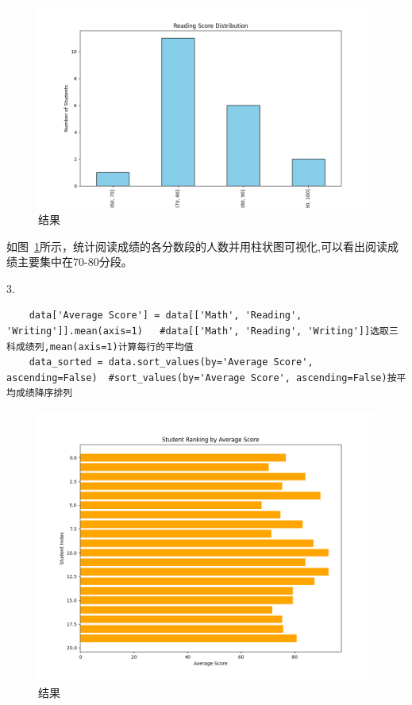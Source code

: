 \documentclass[12pt,a4paper,oneside]{article}
\begin{document}
\begin{figure}[H]
    \centering
    \begin{minipage}{0.4\textwidth}
        \centering
        \includegraphics[width=\textwidth]{image/Figure_1.png} %
        \caption{结果}
        \label{fig:image3}
    \end{minipage}
\end{figure}

如图~\ref{fig:image3}所示，统计阅读成绩的各分数段的人数并用柱状图可视化,可以看出阅读成绩主要集中在70-80分段。


3.\begin{lstlisting}
    data['Average Score'] = data[['Math', 'Reading', 'Writing']].mean(axis=1)   #data[['Math', 'Reading', 'Writing']]选取三科成绩列,mean(axis=1)计算每行的平均值
    data_sorted = data.sort_values(by='Average Score', ascending=False)  #sort_values(by='Average Score', ascending=False)按平均成绩降序排列
\end{lstlisting}

\begin{figure}[H]
    \centering
    \begin{minipage}{0.4\textwidth}
        \centering
        \includegraphics[width=\textwidth]{image/Figure_2.png} %
        \caption{结果}
        \label{fig:image4}
    \end{minipage}
\end{figure}
\end{document}
